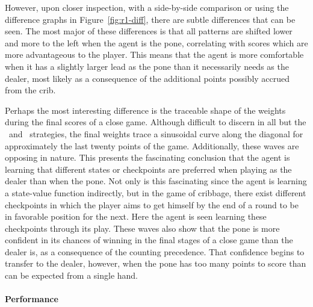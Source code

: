 
However,
upon closer inspection,
with a side-by-side comparison
or using the difference graphs in Figure~\ref{fig:r1-diff},
there are subtle differences that can be seen.
%
The most major of these differences is that all patterns are shifted lower and
more to the left when the agent is the pone,
correlating with scores which are more advantageous to the player.
%
This means that the agent is more comfortable when it has a slightly larger
lead as the pone than it necessarily needs as the dealer,
most likely as a consequence of the
additional points possibly accrued from the crib.



Perhaps the most interesting difference is the traceable shape of the weights
during the final scores of a close game.
%
Although difficult to discern in all but the \handmaxmin\ and \handmaxavg\ 
strategies,
the final weights trace a sinusoidal curve along the diagonal
for approximately the last twenty points of the game.
%
Additionally,
these waves are opposing in nature.
%
This presents the fascinating conclusion that the agent is learning
that different states or checkpoints are preferred when playing as
the dealer than when the pone.
%
Not only is this fascinating since the agent is learning a state-value function
indirectly,
but in the game of cribbage,
there exist different checkpoints in which the player aims to get
himself by the end of a round to be in favorable position for the next.
%
Here the agent is seen learning these checkpoints through its play.
%
These waves also show that the pone is more confident in its chances
of winning in the final stages of a close game than the dealer is,
as a consequence of the counting precedence.
%
That confidence begins to transfer to the dealer, however,
when the pone has too many points to score
than can be expected from a single hand.


\paragraph*{Performance}

